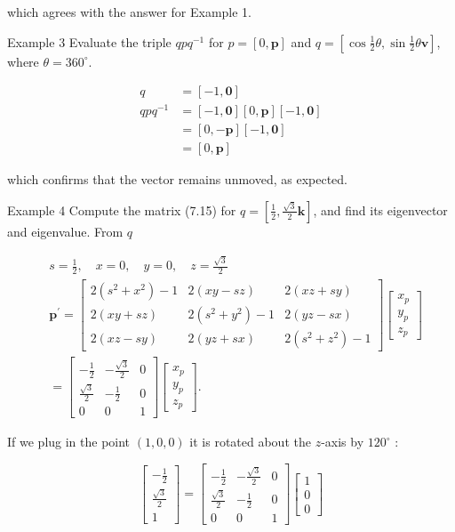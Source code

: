 which agrees with the answer for Example 1.

Example 3 Evaluate the triple $q p q^{-1}$ for $p=[0, \mathbf{p}]$ and $q=\left[\cos \frac{1}{2} \theta, \sin \frac{1}{2} \theta \mathbf{v}\right]$, where $\theta=360^{\circ}$.

$$
\begin{aligned}
q & =[-1, \mathbf{0}] \\
q p q^{-1} & =[-1, \mathbf{0}][0, \mathbf{p}][-1, \mathbf{0}] \\
& =[0,-\mathbf{p}][-1, \mathbf{0}] \\
& =[0, \mathbf{p}]
\end{aligned}
$$

which confirms that the vector remains unmoved, as expected.

Example 4 Compute the matrix (7.15) for $q=\left[\frac{1}{2}, \frac{\sqrt{3}}{2} \mathbf{k}\right]$, and find its eigenvector and eigenvalue. From $q$

$$
\begin{aligned}
& s=\frac{1}{2}, \quad x=0, \quad y=0, \quad z=\frac{\sqrt{3}}{2} \\
& \mathbf{p}^{\prime}=\left[\begin{array}{ccc}2\left(s^{2}+x^{2}\right)-1 & 2(x y-s z) & 2(x z+s y) \\2(x y+s z) & 2\left(s^{2}+y^{2}\right)-1 & 2(y z-s x) \\2(x z-s y) & 2(y z+s x) & 2\left(s^{2}+z^{2}\right)-1\end{array}\right]\left[\begin{array}{l}x_{p} \\y_{p} \\z_{p}\end{array}\right] \\
& =\left[\begin{array}{ccc}-\frac{1}{2} & -\frac{\sqrt{3}}{2} & 0 \\\frac{\sqrt{3}}{2} & -\frac{1}{2} & 0 \\0 & 0 & 1\end{array}\right]\left[\begin{array}{l}x_{p} \\y_{p} \\z_{p}\end{array}\right] \text {. }
\end{aligned}
$$

If we plug in the point $(1,0,0)$ it is rotated about the $z$-axis by $120^{\circ}$ :

$$
\left[\begin{array}{c}
-\frac{1}{2} \\
\frac{\sqrt{3}}{2} \\
1
\end{array}\right]=\left[\begin{array}{ccc}
-\frac{1}{2} & -\frac{\sqrt{3}}{2} & 0 \\
\frac{\sqrt{3}}{2} & -\frac{1}{2} & 0 \\
0 & 0 & 1
\end{array}\right]\left[\begin{array}{l}
1 \\
0 \\
0
\end{array}\right]
$$

